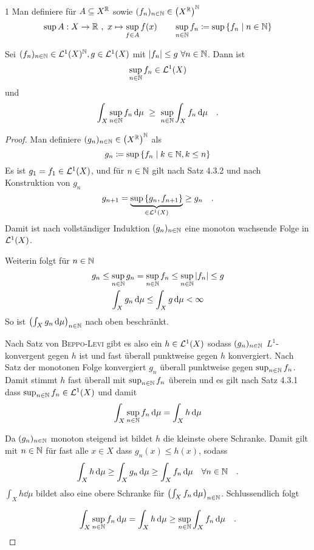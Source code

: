 \documentclass{anablatt}
\begin{document}
\makeheader
\setcounter{taski}1
\task
Man definiere für $A \subseteq X^{\mathbb{R}}$ sowie $(f_n)_{n\in\mathbb{N}} \in \qty(X^{\mathbb{R}})^{\mathbb{N}}$
\[ \sup A : X \rightarrow \mathbb{R} ~,~ x \mapsto \sup_{f \in A} f(x) \qquad \sup_{n\in\mathbb{N}} f_n \coloneqq \sup \qty{f_n \mid n\in\ensuremath{\mathbb{N}} } \]

\begin{theorem}
Sei $(f_n)_{n \in \mathbb{N}} \in \mathcal{L}^1(X)^{\mathbb{N}}, g \in \mathcal{L}^1(X)$ mit $|f_n| \leq g~\forall n \in \mathbb{N}$. Dann ist
\[ \sup_{n\in\mathbb{N}}f_n \in \mathcal{L}^1(X) \]
und
\[ \int_X \sup_{n\in\N}f_n\dd\mu ~\geq~ \sup_{n\in\N}\int_Xf_n\dd\mu \quad. \]
\end{theorem}
\begin{proof}
Man definiere $(g_n)_{n\in\mathbb{N}} \in \qty(X^{\mathbb{R}})^{\mathbb{N}}$ als
\[ g_n \coloneqq \sup\qty{f_n \mid k\in\ensuremath{\mathbb{N}} ,k\leq n}  \]
Es ist $g_1 = f_1 \in \mathcal{L}^1(X)$, und für $n \in \mathbb{N}$ gilt nach Satz 4.3.2 und nach Konstruktion von $g_n$
\[ g_{n+1} = \underbrace{\sup\qty{g_n, f_{n+1}}}_{\in \mathcal{L}^1(X)} \geq g_n \quad.\]
Damit ist nach vollständiger Induktion $(g_n)_{n\in\mathbb{N}}$ eine monoton wachsende Folge in $\mathcal{L}^1(X)$.

Weiterin folgt für $n\in\mathbb{N}$
\begin{gather*}
    g_n \leq \sup_{n\in\N} g_n = \sup_{n\in\N} f_n \leq \sup_{n\in\N} |f_n| \leq g \\
    \int_X g_n\dd\mu \leq \int_Xg\dd\mu < \infty
\end{gather*}
So ist $\qty(\int_X g_n\dd\mu)_{n\in\N}$ nach oben beschränkt.

Nach Satz von \textsc{Beppo-Levi} gibt es also ein $h \in \mathcal{L}^1(X)$ sodass $(g_n)_{n\in\mathbb{N}}$ $L^1$-konvergent gegen $h$ ist und fast überall punktweise gegen $h$ konvergiert. Nach Satz der monotonen Folge konvergiert $g_n$ überall punktweise gegen $\sup_{n\in\mathbb{N}}f_n$. Damit stimmt $h$ fast überall mit $\sup_{n\in\mathbb{N}}f_n$ überein und es gilt nach Satz 4.3.1 dass $\sup_{n\in\mathbb{N}}f_n \in \mathcal{L}^1(X)$ und damit
\[ \int_X\sup_{n\in\N}f_n\dd\mu = \int_Xh\dd\mu \]

Da $(g_n)_{n\in\mathbb{N}}$ monoton steigend ist bildet $h$ die kleinste obere Schranke. Damit gilt mit $n \in \mathbb{N}$ für fast alle $x \in X$ dass $g_n(x) \leq h(x)$, sodass
\[ \int_Xh\dd\mu \geq \int_Xg_n\dd\mu \geq \int_Xf_n\dd\mu \quad\forall n \in \N \quad.\]
$\int_Xh\dd\mu$ bildet also eine obere Schranke für  $\qty(\int_Xf_n\dd\mu)_{n \in \N}$. Schlussendlich folgt

\[ 
    \int_X\sup_{n\in\N}f_n\dd\mu = \int_Xh\dd\mu \geq\sup_{n\in\N}\int_Xf_n\dd\mu \quad.
\]
\end{proof}
\end{document}
